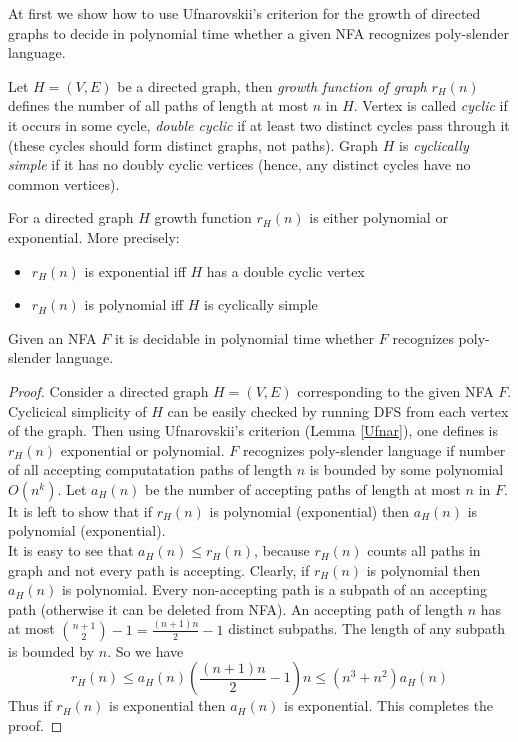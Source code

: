 At first we show how to use Ufnarovskii's criterion for the growth of directed graphs \cite{Ufnarovskii} to decide in polynomial time whether a given NFA recognizes poly-slender language. 


Let $H = (V,  E)$ be a directed graph, then \textit{growth function of graph} $r_H(n)$ defines the number of all paths of length at most $n$ in $H$. Vertex is called \textit{cyclic} if it occurs in some cycle, \textit{double cyclic} if at least two distinct cycles pass through it (these cycles should form distinct graphs, not paths). Graph $H$ is \textit{cyclically simple} if it has no doubly cyclic vertices (hence, any distinct cycles have no common vertices).
\begin{lemma}
\label{Ufnar}
For a directed graph $H$ growth function $r_H(n)$ is either polynomial or exponential. More precisely:
\begin{itemize}
\item $r_H(n)$ is exponential iff $H$ has a double cyclic vertex
\item $r_H(n)$ is polynomial iff $H$ is cyclically simple
\end{itemize}
\end{lemma}
\begin{theorem}
\label{lemconstr}
Given an NFA $F$ it is decidable in polynomial time whether $F$ recognizes poly-slender language.
\end{theorem}
\begin{proof}
Consider a directed graph $H = (V, E)$ corresponding to the given NFA $F$. Cyclicical simplicity of $H$ can be easily checked by running DFS from each vertex of the graph. Then using Ufnarovskii's criterion (Lemma \ref{Ufnar}), one defines is $r_H(n)$ exponential or polynomial. $F$ recognizes poly-slender language if number of all accepting computatation paths of length $n$ is bounded by some polynomial $O(n^k)$. Let $a_H(n)$ be the number of accepting paths of length at most $n$ in $F$. It is left to show that if $r_H(n)$ is polynomial (exponential) then $a_H(n)$ is polynomial (exponential).
\\
It is easy to see that $a_H(n) \le r_H(n)$, because $r_H(n)$ counts all paths in graph and not every path is accepting. Clearly, if $r_H(n)$ is polynomial then $a_H(n)$ is polynomial. 
Every non-accepting path is a subpath of an accepting path (otherwise it can be deleted from NFA). An accepting path of length $n$ has at most $\binom{n+1}{2} -1 = \frac{(n+1)n}{2} -1$ distinct subpaths. The length of any subpath is bounded by $n$. So we have
\begin{equation}
r_H(n) \le a_H(n) (\frac{(n+1)n}{2} -1) n \le (n^3 + n^2) a_H(n)
\end{equation} 
Thus if $r_H(n)$ is exponential then $a_H(n)$ is exponential. This completes the proof.
\end{proof}


